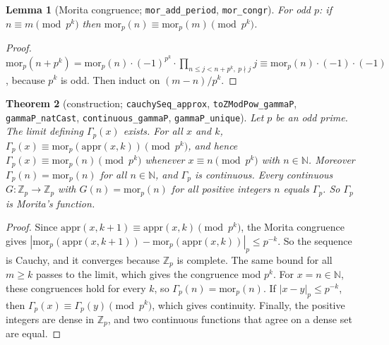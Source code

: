 \documentclass[11pt]{article}
\newtheorem{theorem}{Theorem}
\newtheorem{lemma}[theorem]{Lemma}
\theoremstyle{definition}
\newcommand{\Zp}{\mathbb{Z}_p}
\begin{document}
\begin{lemma}[Morita congruence; \texttt{mor\_add\_period}, \texttt{mor\_congr}]
For odd $p$: if $n \equiv m \pmod{p^k}$ then $\mathrm{mor}_p(n) \equiv \mathrm{mor}_p(m) \pmod{p^k}$.
\end{lemma}
\begin{proof}
$\mathrm{mor}_p(n+p^k) = \mathrm{mor}_p(n)\cdot (-1)^{p^k}\cdot\prod_{n\le j<n+p^k,\ p\nmid j} j
\equiv \mathrm{mor}_p(n)\cdot(-1)\cdot(-1)$, because $p^k$ is odd. Then induct on $(m-n)/p^k$.
\end{proof}

\begin{theorem}[construction; \texttt{cauchySeq\_approx}, \texttt{toZModPow\_gammaP},
\texttt{gammaP\_natCast}, \texttt{continuous\_gammaP}, \texttt{gammaP\_unique}]
Let $p$ be an odd prime. The limit defining $\Gamma_p(x)$ exists. For all $x$ and $k$,
$\Gamma_p(x) \equiv \mathrm{mor}_p(\mathrm{appr}(x,k)) \pmod{p^k}$, and hence
$\Gamma_p(x) \equiv \mathrm{mor}_p(n) \pmod{p^k}$ whenever $x \equiv n \pmod{p^k}$ with
$n \in \mathbb{N}$. Moreover $\Gamma_p(n) = \mathrm{mor}_p(n)$ for all $n \in \mathbb{N}$, and
$\Gamma_p$ is continuous. Every continuous $G : \Zp \to \Zp$ with $G(n) = \mathrm{mor}_p(n)$
for all positive integers $n$ equals $\Gamma_p$. So $\Gamma_p$ is Morita's function.
\end{theorem}
\begin{proof}
Since $\mathrm{appr}(x,k+1) \equiv \mathrm{appr}(x,k) \pmod{p^k}$, the Morita congruence gives
$|\mathrm{mor}_p(\mathrm{appr}(x,k+1)) - \mathrm{mor}_p(\mathrm{appr}(x,k))|_p \le p^{-k}$. So the
sequence is Cauchy, and it converges because $\Zp$ is complete. The same bound for all $m \ge k$
passes to the limit, which gives the congruence mod $p^k$. For $x = n \in \mathbb{N}$, these
congruences hold for every $k$, so $\Gamma_p(n) = \mathrm{mor}_p(n)$. If $|x - y|_p \le p^{-k}$, then
$\Gamma_p(x) \equiv \Gamma_p(y) \pmod{p^k}$, which gives continuity. Finally, the positive integers
are dense in $\Zp$, and two continuous functions that agree on a dense set are equal.
\end{proof}
\end{document}
